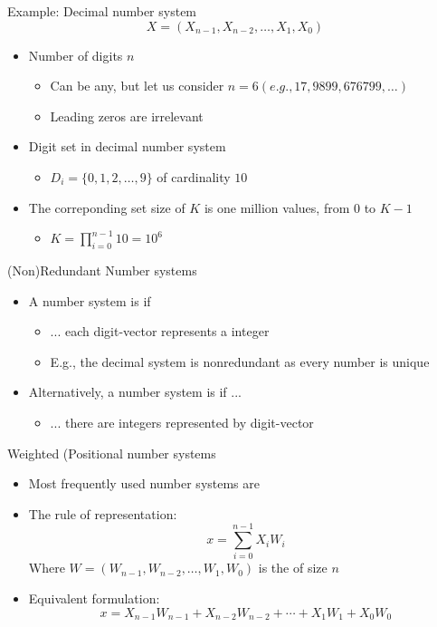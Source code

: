 \begin{parag}{Example: Decimal number system}
    \[X = (X_{n-1}, X_{n-2}, \dots, X_1, X_0)\]
    \begin{itemize}
        \item Number of digits $n$
        \begin{itemize}
            \item Can be any, but let us consider $n = 6 (e.g., 17, 9899, 676799, \dots)$
            \item Leading zeros are irrelevant
        \end{itemize}
        \item Digit set in decimal number system
        \begin{itemize}
            \item $D_i = \{0, 1, 2, \dots, 9\}$ of cardinality $10$
        \end{itemize}
        \item The correponding set size of $K$ is one million values, from $0$ to $K-1$
        \begin{itemize}
            \item $K = \prod_{i = 0}^{n-1} 10 = 10^6$
        \end{itemize}
    \end{itemize}
\end{parag}
\begin{parag}{(Non)Redundant Number systems}
    \begin{itemize}
        \item A number system is  if 
        \begin{itemize}
            \item ... each digit-vector represents a  integer
            \item E.g., the decimal system is nonredundant as every number is unique
        \end{itemize}
        \item Alternatively, a number system is  if ...
        \begin{itemize}
            \item ... there are integers represented by  digit-vector
        \end{itemize}
    \end{itemize}
\end{parag}
\begin{parag}{Weighted (Positional number systems}
    \begin{itemize}
        \item Most frequently used number systems are 
        \item The rule of representation:
        \[x = \sum_{i = 0}^{n-1} X_i W_i\]
        Where $W = (W_{n-1}, W_{n-2}, \dots, W_1, W_0)$ is the  of size $n$
        \item Equivalent formulation:
        \[x = X_{n-1}W_{n-1} + X_{n-2}W_{n-2} + \cdots + X_1W_1 + X_0 W_0\]
    \end{itemize}
\end{parag}
